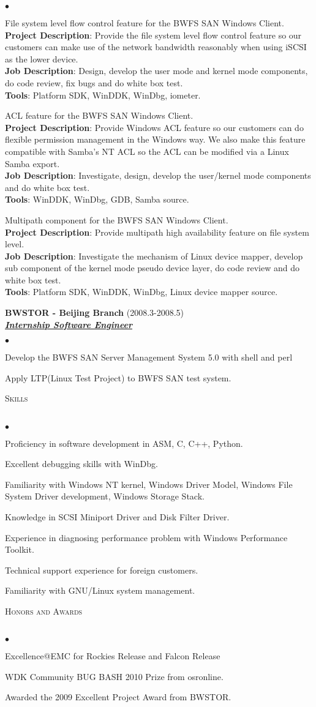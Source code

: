 \documentclass{article}
\newcommand{\lineunder}{\vspace*{-8pt} \\ \hspace*{-18pt} \hrulefill \\}
\newcommand{\header}[1]{{\hspace*{-15pt}\vspace*{6pt} \textsc{#1}} \vspace*{-6pt} \lineunder}
\newcommand{\employer}[3]{{ \textbf{#1} (#2)\\ \underline{\textbf{\emph{#3}}}\\}}
\newcommand{\project}[4]{{#1}\\ \textbf{Project Description}:
  {#2}\\ \textbf{Job Description}: {#3}\\ \textbf{Tools}: {#4}\vspace*{3pt}}
\newenvironment{achievements}{\begin{list}{$\bullet$}{\topsep 0pt \itemsep -2pt}}{\vspace*{6pt}\end{list}}
\begin{document}
\begin{achievements}
\item 
  \project{File system level flow control feature for the BWFS SAN Windows Client.}
          {Provide the file system level flow control feature so our customers can make use of the network bandwidth reasonably when using iSCSI as the lower device.}
          {Design, develop the user mode and kernel mode components, do code review, fix bugs and do white box test.}
          {Platform SDK, WinDDK, WinDbg, iometer.}

\item 
  \project{ACL feature for the BWFS SAN Windows Client.}
          {Provide Windows ACL feature so our customers can do flexible permission management in the Windows way. We also make this feature compatible with Samba's NT ACL so the ACL can be modified via a Linux Samba export.}
          {Investigate, design, develop the user/kernel mode components and do white box test.}
          {WinDDK, WinDbg, GDB, Samba source.}

\item 
  \project{Multipath component for the BWFS SAN Windows Client.}
          {Provide multipath high availability feature on file system level.}
          {Investigate the mechanism of Linux device mapper, develop sub component of the kernel mode pseudo device layer, do code review and do white box test.}
          {Platform SDK, WinDDK, WinDbg, Linux device mapper source.}

\end{achievements}

\employer{BWSTOR - Beijing Branch}{2008.3-2008.5}{Internship Software Engineer}
\begin{achievements}
\item Develop the BWFS SAN Server Management System 5.0 with shell and perl
\item Apply LTP(Linux Test Project) to BWFS SAN test system.
\end{achievements}


\header{Skills}
\begin{achievements}
\item Proficiency in software development in ASM, C, C++, Python.
\item Excellent debugging skills with WinDbg.
\item Familiarity with Windows NT kernel, Windows Driver Model,
  Windows File System Driver development, Windows Storage Stack.
\item Knowledge in SCSI Miniport Driver and Disk Filter Driver.
\item Experience in diagnosing performance problem with Windows
  Performance Toolkit.
\item Technical support experience for foreign customers.
\item Familiarity with GNU/Linux system management.
\end{achievements}


\header{Honors and Awards}
\begin{achievements}
\item Excellence@EMC for Rockies Release and Falcon Release
\item WDK Community BUG BASH 2010 Prize from osronline.
\item Awarded the 2009 Excellent Project Award from BWSTOR.
\end{achievements}
\end{document}
